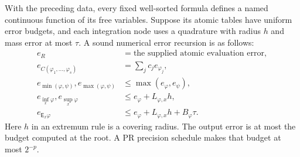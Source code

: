 \begin{theorem}\label{thm:mixed-evaluation}
With the preceding data, every fixed well-sorted formula defines a named
continuous function of its free variables. Suppose its atomic tables have
uniform error budgets, and each integration node uses a quadrature with
radius $h$ and mass error at most $\tau$. A sound numerical error recursion
is as follows:
\begin{align*}
 e_R&=\text{the supplied atomic evaluation error},\\
 e_{C(\varphi_1,\ldots,\varphi_s)}&=\sum_jc_je_{\varphi_j},\\
 e_{\min(\varphi,\psi)},e_{\max(\varphi,\psi)}
     &\le\max(e_\varphi,e_\psi),\\
 e_{\inf_x\varphi},e_{\sup_x\varphi}
     &\le e_\varphi+L_{\varphi,x}h,\\
 e_{\mathsf E_x\varphi}
     &\le e_\varphi+L_{\varphi,x}h+B_\varphi\tau.
\end{align*}
Here $h$ in an extremum rule is a covering radius. The output error is at
most the budget computed at the root. A PR precision schedule makes that
budget at most $2^{-p}$.
\end{theorem}
